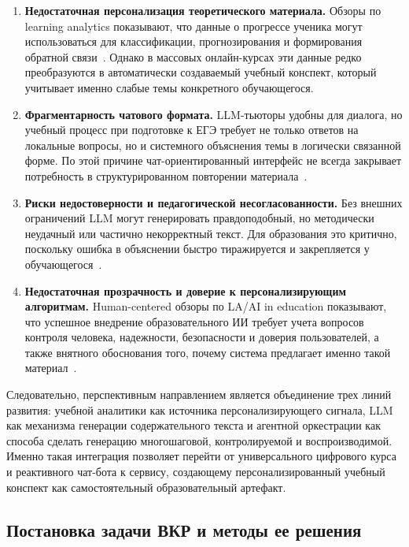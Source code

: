 \documentclass[a4paper,12pt]{extarticle}
\begin{document}
\begin{enumerate}
    \item \textbf{Недостаточная персонализация теоретического материала.} Обзоры по learning analytics показывают, что данные о прогрессе ученика могут использоваться для классификации, прогнозирования и формирования обратной связи~\cite{khor2024la}. Однако в массовых онлайн-курсах эти данные редко преобразуются в автоматически создаваемый учебный конспект, который учитывает именно слабые темы конкретного обучающегося.
    \item \textbf{Фрагментарность чатового формата.} LLM-тьюторы удобны для диалога, но учебный процесс при подготовке к ЕГЭ требует не только ответов на локальные вопросы, но и системного объяснения темы в логически связанной форме. По этой причине чат-ориентированный интерфейс не всегда закрывает потребность в структурированном повторении материала~\cite{kasneci2023chatgpt,shi2025llmedu}.
    \item \textbf{Риски недостоверности и педагогической несогласованности.} Без внешних ограничений LLM могут генерировать правдоподобный, но методически неудачный или частично некорректный текст. Для образования это критично, поскольку ошибка в объяснении быстро тиражируется и закрепляется у обучающегося~\cite{yan2024challenges,ding2025ragedu}.
    \item \textbf{Недостаточная прозрачность и доверие к персонализирующим алгоритмам.} Human-centered обзоры по LA/AI in education показывают, что успешное внедрение образовательного ИИ требует учета вопросов контроля человека, надежности, безопасности и доверия пользователей, а также внятного обоснования того, почему система предлагает именно такой материал~\cite{alfredo2024human}.
\end{enumerate}

Следовательно, перспективным направлением является объединение трех линий развития: учебной аналитики как источника персонализирующего сигнала, LLM как механизма генерации содержательного текста и агентной оркестрации как способа сделать генерацию многошаговой, контролируемой и воспроизводимой. Именно такая интеграция позволяет перейти от универсального цифрового курса и реактивного чат-бота к сервису, создающему персонализированный учебный конспект как самостоятельный образовательный артефакт.

\subsection{Постановка задачи ВКР и методы ее решения}
\end{document}
